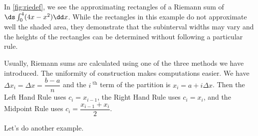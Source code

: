 In \autoref{fig:riedef}, we see the approximating rectangles of a Riemann sum of $\ds\int_0^4(4x-x^2)\dd x$. While the rectangles in this example do not approximate well the shaded area, they demonstrate that the subinterval widths may vary and the heights of the rectangles can be determined without following a particular rule.

Usually, Riemann sums are calculated using one of the three methods we have introduced. The uniformity of construction makes computations easier. We have $\Delta x_i = \Delta x = \dfrac{b-a}n$ and the $i^\text{ th}$ term of the partition is $x_i = a + i\Delta x$.  Then the Left Hand Rule uses $c_i=x_{i-1}$, the Right Hand Rule uses $c_i=x_i$, and the Midpoint Rule uses $c_i=\dfrac{x_{i-1}+x_i}{2}$.


%

Let's do another example.

